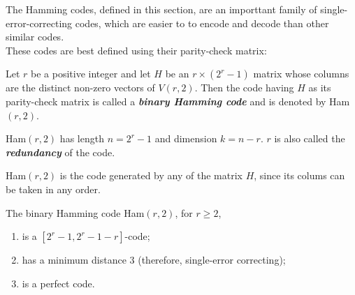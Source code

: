 \documentclass[../main.tex]{subfiles}
\begin{document}
The Hamming codes, defined in this section, are an importtant family of single-error-correcting codes, which are easier to to encode and decode than other similar codes.\\
These codes are best defined using their parity-check matrix:

\begin{defn}
	Let $r$ be a positive integer and let $H$ be an $r\times (2^r - 1)$ matrix whose columns are the distinct non-zero vectors of $V(r,2)$. Then the code having $H$ as its parity-check matrix is called a \textbf{\emph{binary Hamming code}} and is denoted by Ham$(r,2)$.\\
\end{defn}

\begin{remark}
	\begin{enumerate*}[label=(\roman*), before=\unskip{}]
		\item Ham$(r,2)$ has length $n=2^r-1$ and dimension $k = n-r$. $r$ is also called the \textbf{\emph{redundancy}} of the code.\\
		\item Ham$(r,2)$ is the code generated by any of the matrix $H$, since its colums can be taken in any order.
	\end{enumerate*}
\end{remark}

\begin{thm}
	The binary Hamming code Ham$(r,2)$, for $r\geq 2$,
	\begin{enumerate}[label=(\roman*)]
	\itemsep-1mm
		\item is a $[2^r-1, 2^r-1-r]$-code;
		\item has a minimum distance 3 (therefore, single-error correcting);
		\item is a perfect code.
	\end{enumerate}
\end{thm}
\end{document}
